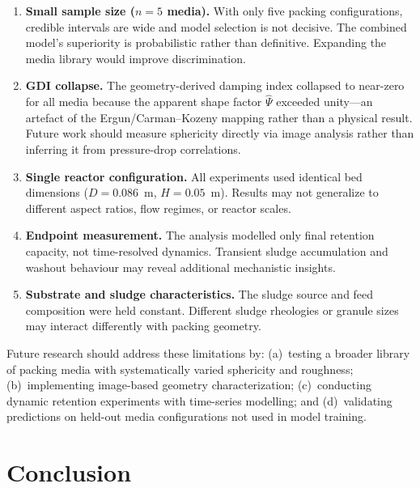 \documentclass[12pt,a4paper]{article}
\begin{document}
\begin{enumerate}
    \item \textbf{Small sample size ($n=5$ media).} With only five packing configurations, credible intervals are wide and model selection is not decisive. The combined model's superiority is probabilistic rather than definitive. Expanding the media library would improve discrimination.

    \item \textbf{GDI collapse.} The geometry-derived damping index collapsed to near-zero for all media because the apparent shape factor $\hat{\Psi}$ exceeded unity---an artefact of the Ergun/Carman--Kozeny mapping rather than a physical result. Future work should measure sphericity directly via image analysis rather than inferring it from pressure-drop correlations.

    \item \textbf{Single reactor configuration.} All experiments used identical bed dimensions ($D = 0.086$~m, $H = 0.05$~m). Results may not generalize to different aspect ratios, flow regimes, or reactor scales.

    \item \textbf{Endpoint measurement.} The analysis modelled only final retention capacity, not time-resolved dynamics. Transient sludge accumulation and washout behaviour may reveal additional mechanistic insights.

    \item \textbf{Substrate and sludge characteristics.} The sludge source and feed composition were held constant. Different sludge rheologies or granule sizes may interact differently with packing geometry.
\end{enumerate}

Future research should address these limitations by: (a)~testing a broader library of packing media with systematically varied sphericity and roughness; (b)~implementing image-based geometry characterization; (c)~conducting dynamic retention experiments with time-series modelling; and (d)~validating predictions on held-out media configurations not used in model training.

\section{Conclusion}
\end{document}
